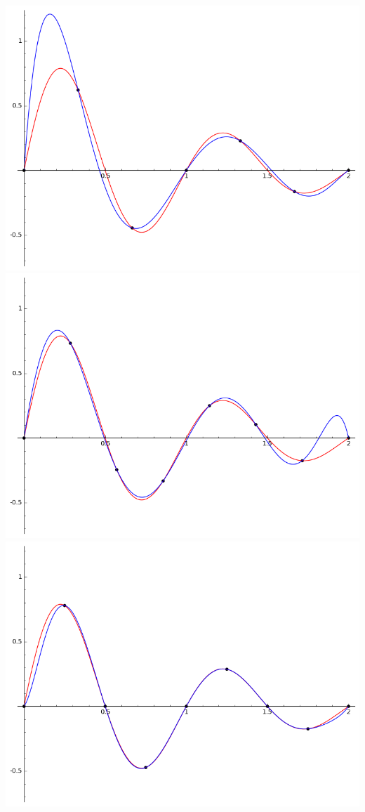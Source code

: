 \documentclass[class=report,crop=false]{standalone}
\begin{document}
\begin{enumerate}
\begin{center}
  \end{center}
  \begin{center}
    \includegraphics[scale=0.2]{figures/lagrange4}\quad
    \includegraphics[scale=0.2]{figures/lagrange5}\quad
    \includegraphics[scale=0.2]{figures/lagrange6}
  \end{center}
  

\end{enumerate}
\end{document}
